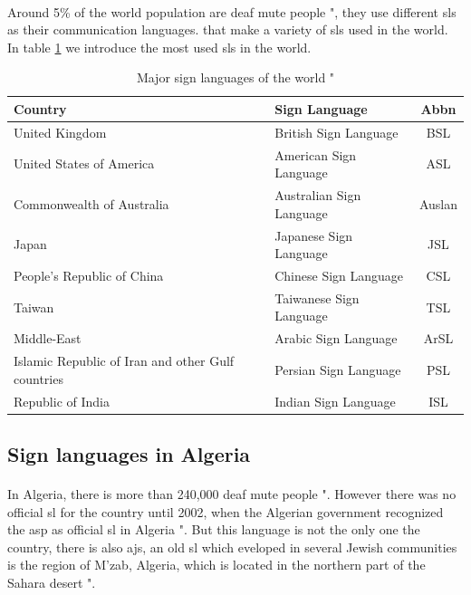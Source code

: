\paragraph{}
Around 5\% of the world population are deaf mute people "\cite{5perc}, they use different \ac{sl}s as their communication languages. that make a variety of \ac{sl}s used in the world. In table \ref{tab:major-sign-languages-of-the-world} we introduce the most used \ac{sl}s in the world.
\begin{table}[h]
	\caption{Major sign languages of the world "\cite{5perc}}
	\label{tab:major-sign-languages-of-the-world}
	\begin{tabular}{|l|l|c|}
		\hline
		\textbf{Country}  & \textbf{Sign Language} & \textbf{Abbn} \\
		\hline
		United Kingdom & British Sign Language & BSL \\
		\hline
		United States of America & American Sign Language & ASL \\
		\hline
		Commonwealth of Australia & Australian Sign Language & Auslan \\
		\hline
		Japan & Japanese Sign Language & JSL \\
		\hline
		People's Republic of China & Chinese Sign Language & CSL \\
		\hline
		Taiwan & Taiwanese Sign Language & TSL \\
		\hline
		Middle-East & Arabic Sign Language & ArSL \\
		\hline
		Islamic Republic of Iran and other Gulf countries & Persian Sign Language & PSL \\
		\hline
		Republic of India & Indian Sign Language & ISL \\
		\hline
	\end{tabular}
\end{table}
\subsection{Sign languages in Algeria}
\paragraph{}
In Algeria, there is more than 240,000 deaf mute people "\cite{ethnologue}. However there was no official \ac{sl} for the country until 2002, when the Algerian government  recognized the \ac{asp} as official \ac{sl} in Algeria "\cite{wiki}. But this language is not the only one the country, there is also \ac{ajs}, an old \ac{sl} which eveloped in several Jewish communities is the region of M'zab, Algeria, which is located in the northern part of the Sahara desert "\cite{sara}.
